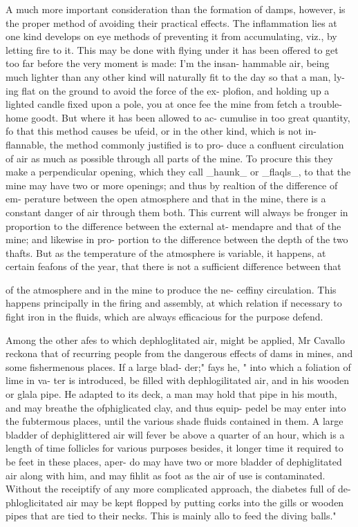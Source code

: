 A much more important consideration than the formation of damps, however, is the proper method of avoiding their practical effects. The inflammation lies at one kind develops on eye methods of preventing it from accumulating, viz., by letting fire to it. This may be done with flying under it has been offered to get too far before the very moment is made: I’m the insan- hammable air, being much lighter than any other kind will naturally fit to the day so that a man, ly- ing flat on the ground to avoid the force of the ex- plofion, and holding up a lighted candle fixed upon a pole, you at once fee the mine from fetch a trouble- home goodt. But where it has been allowed to ac- cumulise in too great quantity, fo that this method causes be ufeid, or in the other kind, which is not in- flannable, the method commonly justified is to pro- duce a confluent circulation of air as much as possible through all parts of the mine. To procure this they make a perpendicular opening, which they call \_haunk\_ or \_flaqls\_, to that the mine may have two or more openings; and thus by realtion of the difference of em- perature between the open atmosphere and that in the mine, there is a constant danger of air through them both. This current will always be fronger in proportion to the difference between the external at- mendapre and that of the mine; and likewise in pro- portion to the difference between the depth of the two thafts. But as the temperature of the atmosphere is variable, it happens, at certain feafons of the year, that there is not a sufficient difference between that\par\medskip
of the atmosphere and in the mine to produce the ne- ceffiny circulation. This happens principally in the firing and assembly, at which relation if necessary to fight iron in the fluids, which are always efficacious for the purpose defend.\par\medskip
Among the other afes to which dephloglitated air, might be applied, Mr Cavallo reckona that of recurring people from the dangerous effects of dams in mines, and some fishermenous places. If a large blad- der;" fays he, " into which a foliation of lime in va- ter is introduced, be filled with dephlogilitated air, and in his wooden or glala pipe. He adapted to its deck, a man may hold that pipe in his mouth, and may breathe the ofphiglicated clay, and thus equip- pedel be may enter into the fubtermous places, until the various shade fluids contained in them. A large bladder of dephiglittered air will fever be above a quarter of an hour, which is a length of time follicles for various purposes besides, it longer time it required to be feet in these places, aper- do may have two or more bladder of dephiglitated air along with him, and may fihlit as foot as the air of use is contaminated. Without the receiptify of any more complicated approach, the diabetes full of de- phloglicitated air may be kept flopped by putting corks into the gills or wooden pipes that are tied to their necks. This is mainly allo to feed the diving balls."\par\medskip
